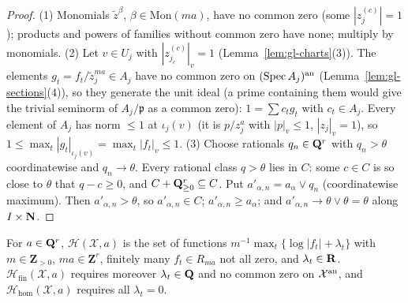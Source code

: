 \begin{proof}
(1) Monomials $\tilde z^\beta$, $\beta\in\mathrm{Mon}(ma)$, have no common zero (some $|z^{(c)}_j|=1$); products and powers of families without common
zero have none; multiply by monomials. (2) Let $v\in U_j$ with $|z^{(c)}_{j_c}|_v=1$ (Lemma~\ref{lem:gl-charts}(3)). The elements
$g_t=f_t/\tilde z_j^{ma}\in A_j$ have no common zero on $(\operatorname{Spec} A_j)^{\mathrm{an}}$ (Lemma~\ref{lem:gl-sections}(4)), so they generate the unit ideal (a
prime containing them would give the trivial seminorm of $A_j/\mathfrak p$ as a common zero): $1=\sum c_tg_t$ with $c_t\in A_j$. Every element of
$A_j$ has norm $\le1$ at $\iota_j(v)$ (it is $p/z_j^a$ with $|p|_v\le1$, $|z_j|_v=1$), so $1\le\max_t|g_t|_{\iota_j(v)}=\max_t|f_t|_v\le1$. (3) Choose rationals $q_n\in\mathbf{Q}^r$ with $q_n>\theta$ coordinatewise and $q_n\to\theta$. Every rational class $q>\theta$ lies in $C$: some $c\in C$ is so close to
$\theta$ that $q-c\ge0$, and $C+\mathbf{Q}^r_{\ge0}\subseteq C$. Put $a'_{\alpha,n}=a_\alpha\vee q_n$ (coordinatewise maximum). Then $a'_{\alpha,n}>\theta$, so $a'_{\alpha,n}\in C$;
$a'_{\alpha,n}\ge a_\alpha$; and $a'_{\alpha,n}\to\theta\vee\theta=\theta$ along $I\times\mathbf{N}$.
\end{proof}

\begin{definition}\label{def:gl-fs}
\leanok
{}
For $a\in\mathbf{Q}^r$, $\mathcal H(\mathcal X,a)$ is the set of functions $m^{-1}\max_t\{\log|f_t|+\lambda_t\}$ with $m\in\mathbf Z_{>0}$,
$ma\in\mathbf Z^r$, finitely many $f_t\in R_{ma}$ not all zero, and $\lambda_t\in\mathbf{R}$. $\mathcal H_{\mathrm{fin}}(\mathcal X,a)$ requires moreover
$\lambda_t\in\mathbf{Q}$ and no common zero on $\mathcal X^{\mathrm{an}}$, and $\mathcal H_{\mathrm{hom}}(\mathcal X,a)$ requires all $\lambda_t=0$.
\end{definition}

